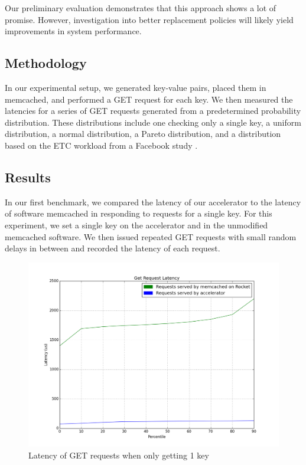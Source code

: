 Our preliminary evaluation demonstrates that this approach shows a lot of
promise. However, investigation into better replacement policies will
likely yield improvements in system performance.

\subsection{Methodology}

In our experimental setup, we generated key-value pairs, placed them in
memcached, and performed a GET request for each key. We then measured the
latencies for a series of GET requests generated from a predetermined
probability distribution. These distributions include one checking only a
single key, a uniform distribution, a normal distribution, a Pareto
distribution, and a distribution based on the ETC workload from a Facebook
study \cite{AXFJP2012}.

\subsection{Results}

In our first benchmark, we compared the latency of our accelerator to the
latency of software memcached in responding to requests for a single key.
For this experiment, we set a single key on the accelerator and in the
unmodified memcached software. We then issued repeated GET requests with
small random delays in between and recorded the latency of each request.

\begin{figure}[t]
\begin{center}
\includegraphics[width=\linewidth]{graph.png}
\caption{Latency of GET requests when only getting 1 key}
\label{fig:one-req}
\end{center}
\end{figure}

